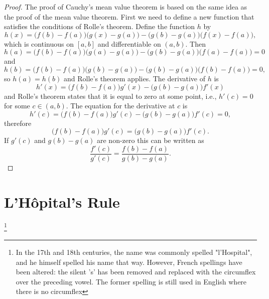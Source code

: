 \documentclass[a4paper]{amsproc}
\theoremstyle{plain}
\numberwithin{equation}{section} %
\numberwithin{figure}{section} %
\theoremstyle{plain}
\theoremstyle{definition}
\theoremstyle{definition}
\theoremstyle{remark}
\begin{document}
\begin{proof}
The proof of Cauchy's mean value theorem is based on the same idea as the proof of the mean value theorem.
First we need to define a new function that satisfies the conditions of Rolle's theorem. Define the function $h$ by
\[
h(x)=\bigl(f(b)-f(a)\bigr)\bigl(g(x)-g(a)\bigr)-\bigl(g(b)-g(a)\bigr)\bigl(f(x)-f(a)\bigr),
\]
which is continuous on $[a,b]$ and differentiable on $(a,b)$. Then
\[
h(a)=\bigl(f(b)-f(a)\bigr)\bigl(g(a)-g(a)\bigr)-\bigl(g(b)-g(a)\bigr)\bigl(f(a)-f(a)\bigr)=0
\]
and
\[
h(b)=\bigl(f(b)-f(a)\bigr)\bigl(g(b)-g(a)\bigr)-\bigl(g(b)-g(a)\bigr)\bigl(f(b)-f(a)\bigr)=0,
\]
so $h(a)=h(b)$ and Rolle's theorem applies. The derivative of $h$ is
\[
h'(x)=\bigl(f(b)-f(a)\bigr)g'(x) - \bigl(g(b)-g(a)\bigr)f'(x)
\]
and Rolle's theorem states that it is equal to zero at some point, i.e., $h'(c)=0$ for some $c\in (a,b)$. The equation for the derivative at $c$ is
\[
h'(c)=\bigl(f(b)-f(a)\bigr)g'(c) - \bigl(g(b)-g(a)\bigr)f'(c)=0,
\]
therefore
\[
\bigl(f(b)-f(a)\bigr)g'(c) = \bigl(g(b)-g(a)\bigr)f'(c).
\]
If $g'(c)$ and $g(b)-g(a)$ are non-zero this can be written as
\[\frac{f'(c)}{g'(c)} = \frac{f(b)-f(a)}{g(b)-g(a)}.\]
\end{proof}

\section{L'H\^{o}pital's Rule}\footnote{In the 17th and 18th centuries, the name was commonly spelled "l'Hospital",
and he himself spelled his name that way. However, French spellings have been altered: the silent 's' has been removed and replaced
with the circumflex over the preceding vowel. The former spelling is still used in English where there is no circumflex}
\end{document}
